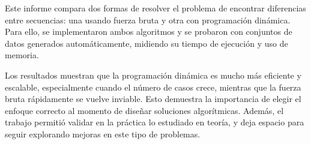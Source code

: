 Este informe compara dos formas de resolver el problema de encontrar diferencias entre secuencias: una usando fuerza bruta y otra con programación dinámica. Para ello, se implementaron ambos algoritmos y se probaron con conjuntos de datos generados automáticamente, midiendo su tiempo de ejecución y uso de memoria.

Los resultados muestran que la programación dinámica es mucho más eficiente y escalable, especialmente cuando el número de casos crece, mientras que la fuerza bruta rápidamente se vuelve inviable. Esto demuestra la importancia de elegir el enfoque correcto al momento de diseñar soluciones algorítmicas. Además, el trabajo permitió validar en la práctica lo estudiado en teoría, y deja espacio para seguir explorando mejoras en este tipo de problemas.


